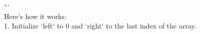 \documentclass[preview]{standalone}
\begin{document}
```\\Here's how it works:\\1. Initialize `left` to 0 and `right` to the last index of the array.\\
\end{document}
